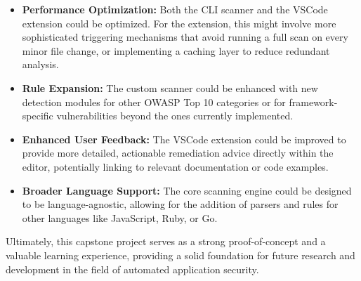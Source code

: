 \begin{itemize}
    \item \textbf{Performance Optimization:} Both the CLI scanner and the VSCode extension could be optimized. For the extension, this might involve more sophisticated triggering mechanisms that avoid running a full scan on every minor file change, or implementing a caching layer to reduce redundant analysis.
    \item \textbf{Rule Expansion:} The custom scanner could be enhanced with new detection modules for other OWASP Top 10 categories or for framework-specific vulnerabilities beyond the ones currently implemented.
    \item \textbf{Enhanced User Feedback:} The VSCode extension could be improved to provide more detailed, actionable remediation advice directly within the editor, potentially linking to relevant documentation or code examples.
    \item \textbf{Broader Language Support:} The core scanning engine could be designed to be language-agnostic, allowing for the addition of parsers and rules for other languages like JavaScript, Ruby, or Go.
\end{itemize}

Ultimately, this capstone project serves as a strong proof-of-concept and a valuable learning experience, providing a solid foundation for future research and development in the field of automated application security.